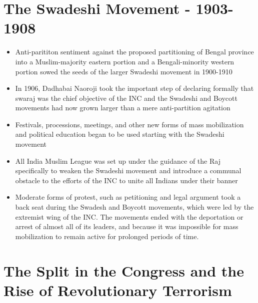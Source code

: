 \section{The Swadeshi Movement - 1903-1908}
\begin{itemize}
    \item Anti-parititon sentiment against the proposed partitioning of Bengal province into a Muslim-majority eastern portion and a Bengali-minority western portion sowed the seeds of the larger Swadeshi movement in 1900-1910
    \item In 1906, Dadhabai Naoroji took the important step of declaring formally that \Gls{swaraj} was the chief objective of the INC and the Swadeshi and Boycott movements had now grown larger than a mere anti-partition agitation
    \item Festivals, processions, meetings, and other new forms of mass mobilization and political education began to be used starting with the Swadeshi movement
    \item All India Muslim League was set up under the guidance of the Raj specifically to weaken the Swadeshi movement and introduce a communal obstacle to the efforts of the INC to unite all Indians under their banner
    \item Moderate forms of protest, such as petitioning and legal argument took a back seat during the Swadesh and Boycott movements, which were led by the extremist wing of the INC. The movements ended with the deportation or arrest of almost all of its leaders, and because it was impossible for mass mobilization to remain active for prolonged periods of time.
\end{itemize}

\section{The Split in the Congress and the Rise of Revolutionary Terrorism}

